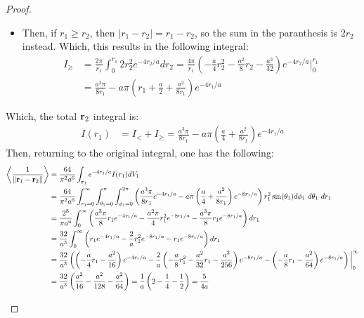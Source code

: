\documentclass{article}
\begin{document}
\begin{proof}
\begin{itemize}
\begin{itemize}
            \begin{align}
                I_<&= \frac{2\pi}{r_1}2r_1\int_{r_1}^{\infty}r_2e^{-4r_2/a}dr_2 = 4\pi\left(-\frac{a}{4}r_2 - \frac{a^2}{16}\right)e^{-4r_2/a}\bigg|_{r_1}^{\infty} = a\pi\left(r_1+\frac{a}{4}\right)e^{-4r_1/a}
            \end{align}
            \item Then, if $r_1\geq r_2$, then $|r_1-r_2|=r_1-r_2$, so the sum in the paranthesis is $2r_2$ instead. Which, this results in the following integral:
            \begin{align}
                I_\geq &= \frac{2\pi}{r_1}\int_{0}^{r_1}2r_2^2e^{-4r_2/a}dr_2 = \frac{4\pi}{r_1}\left(-\frac{a}{4}r_2^2-\frac{a^2}{8}r_2 - \frac{a^3}{32}\right)e^{-4r_2/a}\bigg|_{0}^{r_1}\\
                &= \frac{a^3\pi}{8r_1}-a\pi\left(r_1+\frac{a}{2}+\frac{a^2}{8r_1}\right)e^{-4r_1/a} 
            \end{align}
        \end{itemize}
        Which, the total $\mathbf{r}_2$ integral is:
        \begin{align}
            I(r_1) &= I_<+I_\geq = \frac{a^3\pi}{8r_1}-a\pi\left(\frac{a}{4}+\frac{a^2}{8r_1}\right)e^{-4r_1/a}
        \end{align}
        Then, returning to the original integral, one has the following:
        \begin{align}
            \left<\frac{1}{\|\br_1-\br_2\|}\right> &= \frac{64}{\pi^2a^6}\int_{\br_1}e^{-4r_1/a}I(r_1)dV_1\\
            &= \frac{64}{\pi^2a^6}\int_{r_1=0}^\infty\int_{\theta_1=0}^{\pi}\int_{\phi_1=0}^{2\pi}\left(\frac{a^3\pi}{8r_1}e^{-4r_1/a}-a\pi\left(\frac{a}{4}+\frac{a^2}{8r_1}\right)e^{-8r_1/a}\right)r_1^2\sin(\theta_1)d\phi_1\ d\theta_1\ dr_1\\
            &= \frac{2^8}{\pi a^6}\int_{0}^{\infty}\left(\frac{a^3\pi}{8}r_1e^{-4r_1/a}-\frac{a^2\pi}{4}r_1^2e^{-8r_1/a} - \frac{a^3\pi}{8}r_1e^{-8r_1/a}\right)dr_1\\
            &= \frac{32}{a^3}\int_{0}^{\infty}\left(r_1e^{-4r_1/a}-\frac{2}{a}r_1^2e^{-8r_1/a}-r_1e^{-8r_1/a}\right)dr_1\\
            &= \frac{32}{a^3}\left(\left(-\frac{a}{4}r_1-\frac{a^2}{16}\right)e^{-4r_1/a} - \frac{2}{a}\left(-\frac{a}{8}r_1^2-\frac{a^2}{32}r_1-\frac{a^3}{256}\right)e^{-8r_1/a}-\left(-\frac{a}{8}r_1-\frac{a^2}{64}\right)e^{-8r_1/a}\right)\bigg|_{0}^{\infty}\\
            &= \frac{32}{a^3}\left(\frac{a^2}{16}-\frac{a^2}{128}-\frac{a^2}{64}\right) = \frac{1}{a}\left(2-\frac{1}{4}-\frac{1}{2}\right) = \frac{5}{4a}
        \end{align}


\end{itemize}
\end{proof}
\end{document}
